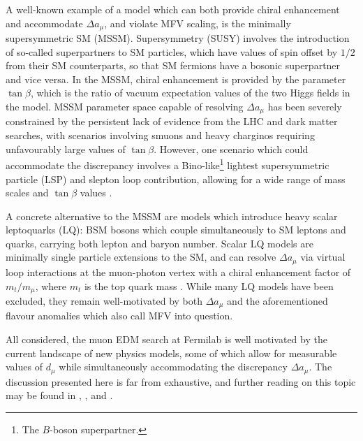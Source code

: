 A well-known example of a model which can both provide chiral enhancement and accommodate $\Delta a_{\mu}$, and violate MFV scaling, is the minimally supersymmetric SM (MSSM). Supersymmetry (SUSY) involves the introduction of so-called superpartners to SM particles, which have values of spin offset by $1/2$ from their SM counterparts, so that SM fermions have a bosonic superpartner and vice versa. In the MSSM, chiral enhancement is provided by the parameter $\tan\beta$, which is the ratio of vacuum expectation values of the two Higgs fields in the model. MSSM parameter space capable of resolving $\Delta a_{\mu}$ has been severely constrained by the persistent lack of evidence from the LHC and dark matter searches, with scenarios involving smuons and heavy charginos requiring unfavourably large values of $\tan\beta$. However, one scenario which could accommodate the discrepancy involves a Bino-like\footnote{The $B$-boson superpartner.} lightest supersymmetric particle (LSP) and slepton loop contribution, allowing for a wide range of mass scales and $\tan \beta$ values \cite{NewPhysicsExplanations2021}. 

A concrete alternative to the MSSM are models which introduce heavy scalar leptoquarks (LQ): BSM bosons which couple simultaneously to SM leptons and quarks, carrying both lepton and baryon number. Scalar LQ models are minimally single particle extensions to the SM, and can resolve $\Delta a_{\mu}$ via virtual loop interactions at the muon-photon vertex with a chiral enhancement factor of $m_{t}/m_{\mu}$, where $m_{t}$ is the top quark mass \cite{NewPhysicsExplanations2021}. While many LQ models have been excluded, they remain well-motivated by both $\Delta a_{\mu}$ and the aforementioned flavour anomalies which also call MFV into question.

All considered, the muon EDM search at Fermilab is well motivated by the current landscape of new physics models, some of which allow for measurable values of $d_{\mu}$ while simultaneously accommodating the discrepancy $\Delta a_{\mu}$. The discussion presented here is far from exhaustive, and further reading on this topic may be found in \cite{CombinedExplantionsForaMuAndEDM2018}, \cite{CombinedExplantionsForaMuAndEDM2020}, and \cite{NewPhysicsExplanations2021}.






